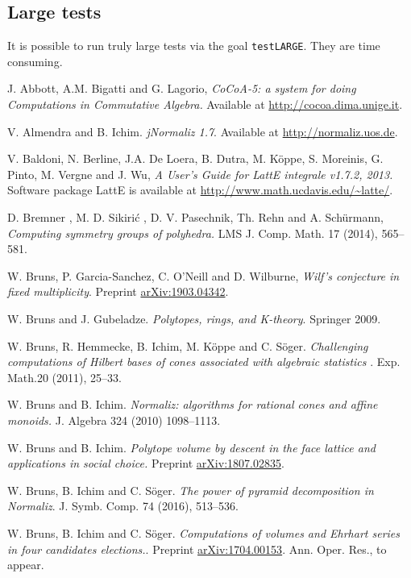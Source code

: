 \documentclass[12pt,a4paper]{scrartcl}
\theoremstyle{definition}
\begin{document}
\subsection{Large tests}
It is possible to run truly large tests via the goal \verb|testLARGE|. They are time consuming.
\begin{thebibliography}{15.}
\small

J. Abbott, A.M. Bigatti and G. Lagorio,
\emph{CoCoA-5: a system for doing {C}omputations in {C}ommutative {A}lgebra.}
Available at \url{http://cocoa.dima.unige.it}.

 V. Almendra  and B. Ichim. {\em  jNormaliz 1.7}.
Available at \url{http://normaliz.uos.de}.

 V. Baldoni, N. Berline, J.A. De Loera, B. Dutra, M. K\"oppe, S. Moreinis, G. Pinto, M. Vergne and  J. Wu,
\emph{A User's Guide for LattE integrale v1.7.2, 2013.} Software package
LattE is available at \url{http://www.math.ucdavis.edu/~latte/}.

D. Bremner , M. D. Sikiri\'c , D. V. Pasechnik, Th. Rehn and A. Schürmann,
\emph{Computing symmetry groups of polyhedra.}
LMS J. Comp. Math. 17 (2014), 565--581.

 W. Bruns, P. Garcia-Sanchez, C. O'Neill and D. Wilburne, \emph{Wilf's conjecture in fixed multiplicity}. Preprint \url{arXiv:1903.04342}.


 W. Bruns and J. Gubeladze. {\em Polytopes, rings, and K-theory}.
Springer 2009.

 W. Bruns, R. Hemmecke, B. Ichim, M. K\"oppe and C. S\"oger.
{\em Challenging computations of Hilbert bases of cones associated with
algebraic statistics }. Exp. Math.20 (2011), 25--33.

 W. Bruns and B. Ichim. {\em Normaliz: algorithms for rational cones and affine monoids.}
J. Algebra 324 (2010) 1098--1113.

 W. Bruns and B. Ichim. {\em Polytope volume by descent in the face lattice and applications in social choice.} Preprint \url{arXiv:1807.02835}.

 W. Bruns, B. Ichim and C. S\"oger. {\em The power of
pyramid decomposition in Normaliz}. J. Symb. Comp. 74 (2016), 513--536.

 W. Bruns, B. Ichim and C. S\"oger. {\em Computations of volumes and Ehrhart series in four candidates elections.}. Preprint \url{arXiv:1704.00153}. Ann. Oper. Res., to appear.


\end{thebibliography}
\end{document}
